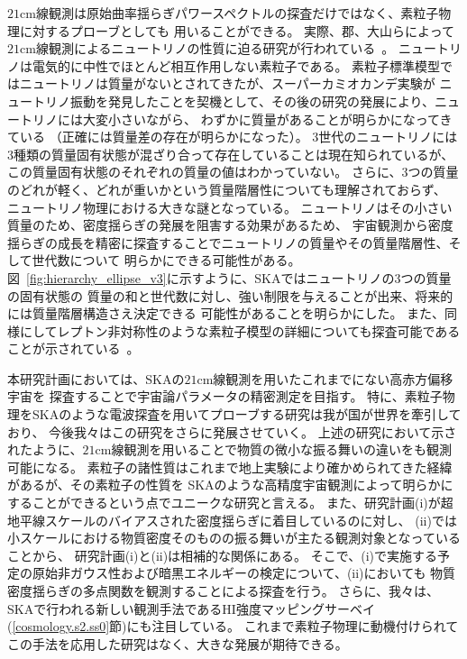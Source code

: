 \begin{enumerate}
$21$cm線観測は原始曲率揺らぎパワースペクトルの探査だけではなく、素粒子物理に対するプローブとしても
用いることができる。
実際、郡、大山らによって$21$cm線観測によるニュートリノの性質に迫る研究が行われている~\citep{Oyama:2012tq}。
ニュートリノは電気的に中性でほとんど相互作用しない素粒子である。
素粒子標準模型ではニュートリノは質量がないとされてきたが、スーパーカミオカンデ実験が
ニュートリノ振動を発見したことを契機として、その後の研究の発展により、ニュートリノには大変小さいながら、
わずかに質量があることが明らかになってきている
（正確には質量差の存在が明らかになった）。
$3$世代のニュートリノには$3$種類の質量固有状態が混ざり合って存在していることは現在知られているが、
この質量固有状態のそれぞれの質量の値はわかっていない。
さらに、$3$つの質量のどれが軽く、どれが重いかという質量階層性についても理解されておらず、
ニュートリノ物理における大きな謎となっている。
ニュートリノはその小さい質量のため、密度揺らぎの発展を阻害する効果があるため、
宇宙観測から密度揺らぎの成長を精密に探査することでニュートリノの質量やその質量階層性、そして世代数について
明らかにできる可能性がある。
図~\ref{fig:hierarchy_ellipse_v3}に示すように、SKAではニュートリノの$3$つの質量の固有状態の
質量の和と世代数に対し、強い制限を与えることが出来、将来的には質量階層構造さえ決定できる
可能性があることを明らかにした。
また、同様にしてレプトン非対称性のような素粒子模型の詳細についても探査可能であることが示されている~\citep{Kohri:2014hea}。

本研究計画においては、SKAの$21$cm線観測を用いたこれまでにない高赤方偏移宇宙を
探査することで宇宙論パラメータの精密測定を目指す。
特に、素粒子物理をSKAのような電波探査を用いてプローブする研究は我が国が世界を牽引しており、
今後我々はこの研究をさらに発展させていく。
上述の研究において示されたように、$21$cm線観測を用いることで物質の微小な振る舞いの違いをも観測可能になる。
素粒子の諸性質はこれまで地上実験により確かめられてきた経緯があるが、その素粒子の性質を
SKAのような高精度宇宙観測によって明らかにすることができるという点でユニークな研究と言える。
また、研究計画(i)が超地平線スケールのバイアスされた密度揺らぎに着目しているのに対し、
(ii)では小スケールにおける物質密度そのものの振る舞いが主たる観測対象となっていることから、
研究計画(i)と(ii)は相補的な関係にある。
そこで、(i)で実施する予定の原始非ガウス性および暗黒エネルギーの検定について、(ii)においても
物質密度揺らぎの多点関数を観測することによる探査を行う。
さらに、我々は、SKAで行われる新しい観測手法であるHI強度マッピングサーベイ
(\ref{cosmology.s2.ss0}節)にも注目している。
これまで素粒子物理に動機付けられてこの手法を応用した研究はなく、大きな発展が期待できる。


\end{enumerate}
